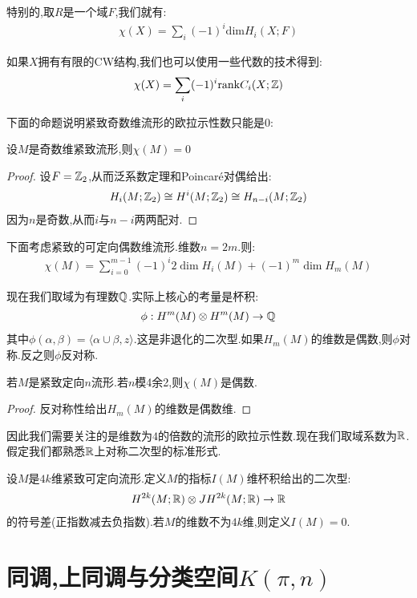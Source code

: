 特别的,取$R$是一个域$F$,我们就有:
\begin{align*}
    \chi(X)=\sum_{i}(-1)^i \mathrm{dim}H_i(X;F)
\end{align*}

如果$X$拥有有限的CW结构,我们也可以使用一些代数的技术得到:
\begin{align*}
    \chi(X)=\sum_{i}(-1)^i \mathrm{rank}C_i(X;\mathbb{Z})
\end{align*}

下面的命题说明紧致奇数维流形的欧拉示性数只能是$0$:
\begin{proposition}
    设$M$是奇数维紧致流形,则$\chi(M)=0$
\end{proposition}
\begin{proof}
    设$F=\mathbb{Z}_2$,从而泛系数定理和Poincar\'{e}对偶给出:
    \begin{align*}
        H_{i}(M;\mathbb{Z}_2)\cong H^i(M;\mathbb{Z}_2)\cong H_{n-i}(M;\mathbb{Z}_2)
    \end{align*}
    因为$n$是奇数,从而$i$与$n-i$两两配对.
\end{proof}

下面考虑紧致的可定向偶数维流形.维数$n=2m$.则:
\begin{align*}
    \chi(M)=\sum_{i=0}^{m-1}(-1)^i2\dim H_i(M)+(-1)^m \dim H_m(M) 
\end{align*}

现在我们取域为有理数$\mathbb{Q}$.实际上核心的考量是杯积:
\begin{align*}
    \phi:H^m(M)\otimes H^m(M)\to \mathbb{Q}
\end{align*}
其中$\phi(\alpha,\beta)=\langle \alpha \cup \beta,z\rangle$.这是非退化的二次型.如果$H_m(M)$的维数是偶数,则$\phi$对称.反之则$\phi$反对称.
\begin{proposition}
    若$M$是紧致定向$n$流形.若$n$模4余2,则$\chi(M)$是偶数.
\end{proposition}
\begin{proof}
    反对称性给出$H_m(M)$的维数是偶数维.
\end{proof}

因此我们需要关注的是维数为$4$的倍数的流形的欧拉示性数.现在我们取域系数为$\mathbb{R}$.假定我们都熟悉$\mathbb{R}$上对称二次型的标准形式.

\begin{definition}
    设$M$是$4k$维紧致可定向流形.定义$M$的指标$I(M)$维杯积给出的二次型:
    \begin{align*}
        H^{2k}(M;\mathbb{R})\otimes JH^{2k}(M;\mathbb{R}) \to \mathbb{R}
    \end{align*}
    的符号差(正指数减去负指数).若$M$的维数不为$4k$维,则定义$I(M)=0$.
\end{definition}

\chapter{同调,上同调与分类空间$K(\pi,n)$}
\ifx\allfiles\undefined
	
	
	
	
	\else
	\fi


